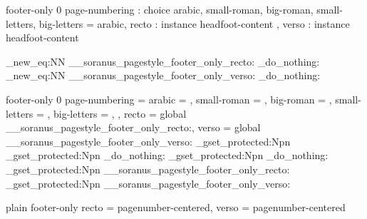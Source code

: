 %

 { footer-only } { 0 }
  {
    page-numbering : choice
      { arabic, small-roman, big-roman, small-letters, big-letters }
                                         = arabic,
    recto          : instance { headfoot-content },
    verso          : instance { headfoot-content }
  }

\cs_new_eq:NN \__soranus_pagestyle_footer_only_recto: \prg_do_nothing:
\cs_new_eq:NN \__soranus_pagestyle_footer_only_verso: \prg_do_nothing:

 { footer-only } { 0 }
  {
    page-numbering =
      {
        arabic        = ,
        small-roman   = ,
        big-roman     = ,
        small-letters = ,
        big-letters   = ,
      },
      recto        = global \__soranus_pagestyle_footer_only_recto:,
      verso        = global \__soranus_pagestyle_footer_only_verso:
  }
  {
    \AssignTemplateKeys
    \cs_gset_protected:Npn \@mkboth { \markboth }
    \cs_gset_protected:Npn \@oddhead
      { \prg_do_nothing: }
    \cs_gset_protected:Npn \@evenhead
      { \prg_do_nothing: }
    \cs_gset_protected:Npn \@oddfoot
      { \__soranus_pagestyle_footer_only_recto: }
    \cs_gset_protected:Npn \@evenfoot
      { \__soranus_pagestyle_footer_only_verso: }
  }


%

 { plain } { footer-only }
  {
    recto = pagenumber-centered,
    verso = pagenumber-centered
  }
